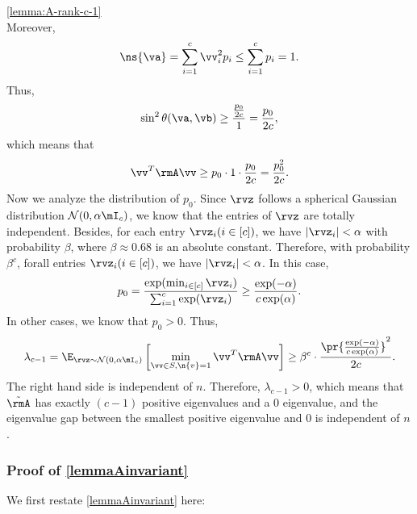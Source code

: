 \begin{proofof}{\cref{lemma:A-rank-c-1}}
\begin{equation}
\end{equation}
Moreover,
\begin{equation}
\ns{\va} = \sum_{i=1}^c \vv_i^2p_i \leq \sum_{i=1}^c p_i = 1.
\end{equation}
Thus,
\begin{equation}
\sin^2\theta(\va,\vb) \geq \frac{\frac{p_0}{2c}}{1} = \frac{p_0}{2c},
\end{equation}
which means that
\begin{equation}
\vv^T\rmA\vv \geq p_0\cdot 1\cdot\frac{p_0}{2c} = \frac{p_0^2}{2c}.
\end{equation}
Now we analyze the distribution of $p_0$. Since $\rvz$ follows a spherical Gaussian distribution $\mathcal{N}(0,\alpha \mI_c)$, we know that the entries of $\rvz$ are totally independent. Besides, for each entry $\rvz_i(i\in[c])$, we have $|\rvz_i|<\alpha$ with probability $\beta$, where $\beta\approx 0.68$ is an absolute constant. Therefore, with probability $\beta^c$, forall entries $\rvz_i(i\in[c])$, we have $|\rvz_i|<\alpha$. In this case,
\begin{equation}
p_0 = \frac{\exp(\min_{i\in[c]}\rvz_i)}{\sum_{i=1}^c\exp(\rvz_i)}\geq\frac{\exp(-\alpha)}{c\exp(\alpha)}.
\end{equation}
In other cases, we know that $p_0>0$. Thus,
\begin{equation}
\label{lower-bound-c-1-eigenvalue-of-A}
\lambda_{c-1} = \E_{\rvz\sim\mathcal{N}(0,\alpha \mI_c)}\left[\min_{\vv\in S, \n{v}=1}\vv^T\rmA\vv\right]\geq \beta^c\cdot\frac{\pr{\frac{\exp(-\alpha)}{c\exp(\alpha)}}^2}{2c}.
\end{equation}
The right hand side is independent of $n$. Therefore, $\lambda_{c-1}>0$, which means that $\tilde{\rmA}$ has exactly $(c-1)$ positive eigenvalues and a $0$ eigenvalue, and the eigenvalue gap between the smallest positive eigenvalue and 0 is independent of $n$.
\end{proofof}

\subsubsection{Proof of \cref{lemmaAinvariant}}
\label{proof-a-invariant}
We first restate \cref{lemmaAinvariant} here:
\lemmaAinvariant*

